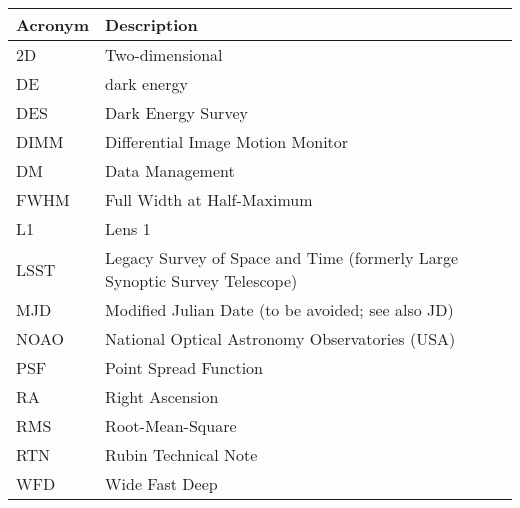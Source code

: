 \addtocounter{table}{-1}
\begin{longtable}{p{}p{}}\hline
\textbf{Acronym} & \textbf{Description}  \\\hline

2D & Two-dimensional \\\hline
DE & dark energy \\\hline
DES & Dark Energy Survey \\\hline
DIMM & Differential Image Motion Monitor \\\hline
DM & Data Management \\\hline
FWHM & Full Width at Half-Maximum \\\hline
L1 & Lens 1 \\\hline
LSST & Legacy Survey of Space and Time (formerly Large Synoptic Survey Telescope) \\\hline
MJD & Modified Julian Date (to be avoided; see also JD) \\\hline
NOAO & National Optical Astronomy Observatories (USA) \\\hline
PSF & Point Spread Function \\\hline
RA & Right Ascension \\\hline
RMS & Root-Mean-Square \\\hline
RTN & Rubin Technical Note \\\hline
WFD & Wide Fast Deep \\\hline
\end{longtable}
